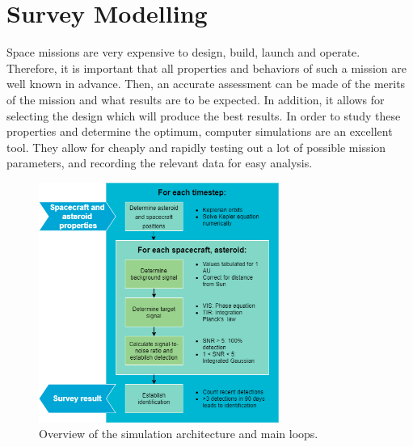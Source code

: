 \chapter{Survey Modelling}

Space missions are very expensive to design, build, launch and operate. Therefore, it is important that all properties and behaviors of such a mission are well known in advance. Then, an accurate assessment can be made of the merits of the mission and what results are to be expected. In addition, it allows for selecting the design which will produce the best results. In order to study these properties and determine the optimum, computer simulations are an excellent tool. They allow for cheaply and rapidly testing out a lot of possible mission parameters, and recording the relevant data for easy analysis. \\

\begin{figure}[htbp]
 \centering
 \includegraphics[width=0.7\textwidth]{img/simulation_overview.png}
 \caption{Overview of the simulation architecture and main loops.}
 \label{fig:simulation_overview}
\end{figure}

